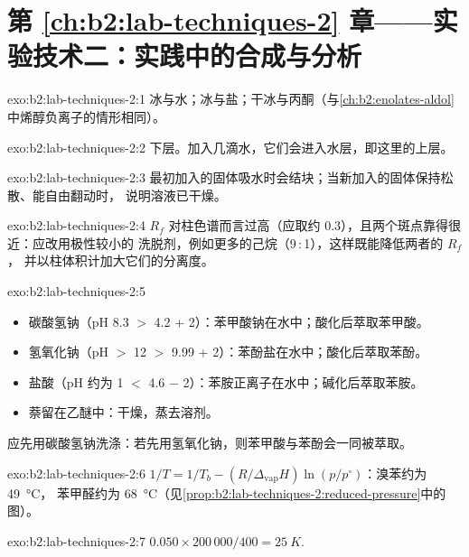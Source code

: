 \section*{第 \ref{ch:b2:lab-techniques-2} 章——实验技术二：实践中的合成与分析}

\begin{solution}{exo:b2:lab-techniques-2:1}
冰与水；冰与盐；干冰与丙酮（与\cref{ch:b2:enolates-aldol}中烯醇负离子的情形相同）。
\end{solution}

\begin{solution}{exo:b2:lab-techniques-2:2}
下层。加入几滴水，它们会进入水层，即这里的上层。
\end{solution}

\begin{solution}{exo:b2:lab-techniques-2:3}
最初加入的固体吸水时会结块；当新加入的固体保持松散、能自由翻动时，
说明溶液已干燥。
\end{solution}

\begin{solution}{exo:b2:lab-techniques-2:4}
$R_f$ 对柱色谱而言过高（应取约 0.3），且两个斑点靠得很近：应改用极性较小的
洗脱剂，例如更多的己烷（9\,:\,1），这样既能降低两者的 $R_f$，
并以柱体积计加大它们的分离度。
\end{solution}

\begin{solution}{exo:b2:lab-techniques-2:5}
\begin{itemize}
  \item 碳酸氢钠（pH 8.3 $>$ 4.2 + 2）：苯甲酸钠在水中；酸化后萃取苯甲酸。
  \item 氢氧化钠（pH $>$ 12 $>$ 9.99 + 2）：苯酚盐在水中；酸化后萃取苯酚。
  \item 盐酸（pH 约为 1 $<$ 4.6 $-$ 2）：苯胺正离子在水中；碱化后萃取苯胺。
  \item 萘留在乙醚中：干燥，蒸去溶剂。
\end{itemize}
应先用碳酸氢钠洗涤：若先用氢氧化钠，则苯甲酸与苯酚会一同被萃取。
\end{solution}

\begin{solution}{exo:b2:lab-techniques-2:6}
$1/T = 1/T_b - (R/\Delta_{\mathrm{vap}}H)\ln(p/p^\circ)$：溴苯约为 \qty{49}{\degreeCelsius}，
苯甲醛约为 \qty{68}{\degreeCelsius}（见\cref{prop:b2:lab-techniques-2:reduced-pressure}中的图）。
\end{solution}

\begin{solution}{exo:b2:lab-techniques-2:7}
$0.050 \times 200\,000/400 = \qty{25}{K}$.
\end{solution}

